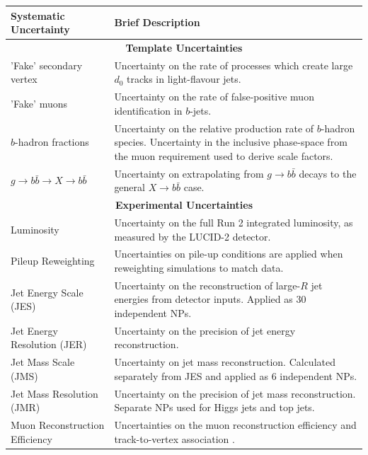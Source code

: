 \documentclass[10pt,a4paper]{book}
\begin{document}
\begin{table}[hbtp]
    \centering
    \begin{tabular}{|l|p{8.5cm}|}
        \hline
        \textbf{Systematic Uncertainty} & \textbf{Brief Description} \\
        \hline
        \multicolumn{2}{|c|}{\textbf{Template Uncertainties}} \\
        \hline
        'Fake' secondary vertex & Uncertainty on the rate of processes which create large $d_0$ tracks in light-flavour jets. \\
        \hline
        'Fake' muons & Uncertainty on the rate of false-positive muon identification in $b$-jets. \\
        \hline
        $b$-hadron fractions & Uncertainty on the relative production rate of $b$-hadron species. Uncertainty in the inclusive phase-space from the muon requirement used to derive scale factors. \\
        \hline
        $g \rightarrow b \bar{b} \rightarrow X \rightarrow b \bar{b}$ & Uncertainty on extrapolating from $g \rightarrow b \bar{b}$ decays to the general $X \rightarrow b \bar{b}$ case. \\
        \hline
        \multicolumn{2}{|c|}{\textbf{Experimental Uncertainties}} \\
        \hline
        Luminosity & Uncertainty on the full Run 2 integrated luminosity, as measured by the LUCID-2 detector. \\
        \hline
        Pileup Reweighting & Uncertainties on pile-up conditions are applied when reweighting simulations to match data. \\
        \hline
        Jet Energy Scale (JES) & Uncertainty on the reconstruction of large-$R$ jet energies from detector inputs. Applied as 30 independent NPs. \\
        \hline
        Jet Energy Resolution (JER) & Uncertainty on the precision of jet energy reconstruction. \\
        \hline
        Jet Mass Scale (JMS) & Uncertainty on jet mass reconstruction. Calculated separately from JES and applied as 6 independent NPs. \\
        \hline
        Jet Mass Resolution (JMR) & Uncertainty on the precision of jet mass reconstruction. Separate NPs used for Higgs jets and top jets. \\
        \hline
        Muon Reconstruction Efficiency & Uncertainties on the muon reconstruction efficiency and track-to-vertex association \cite{ATLAS:2016lqx}. \\

\end{tabular}
\end{table}
\end{document}

